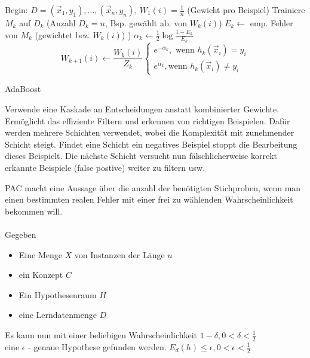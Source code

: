 \begin{algorithm}[H]
    \begin{algorithmic}
        \State Begin: $D = {(\vec{x}_1,y_1),\dots,(\vec{x}_n,y_n)}$, $W_1(i) = \frac{1}{n}$ (Gewicht pro Beispiel)
        \State Trainiere $M_k$ auf $D_k$ (Anzahl $D_k = n$, Bsp. gewählt ab. von $W_k(i)$)
        \State $E_k \leftarrow$ emp. Fehler von $M_k$ (gewichtet bez. $W_k(i)$) )
        \State $\alpha_k \leftarrow \frac{1}{2} \log \frac{1-E_k}{E_k}$
        \begin{equation}W_{k+1}(i) \leftarrow \frac{W_k(i)}{Z_k}\begin{cases}
            e^{-\alpha_k}, \text{ wenn } h_k(\vec{x}_i) = y_i \\
                                                            e^{\alpha_k}, \text{wenn } h_k(\vec{x}_i) \neq y_i
                                                        \end{cases}\end{equation}
        \EndFor
        \caption{AdaBoost}
    \end{algorithmic}
\end{algorithm}

Verwende eine Kaskade an Entscheidungen anstatt kombinierter Gewichte.
Ermöglicht das effiziente Filtern und erkennen von richtigen Beispielen.
Dafür werden mehrere Schichten verwendet, wobei die Komplexität mit zunehmender
Schicht steigt. Findet eine Schicht ein negatives Beispiel stoppt die Bearbeitung
dieses Beispielt. Die nächste Schicht versucht nun fälschlicherweise korrekt
erkannte Beispiele (false postive) weiter zu filtern usw.


PAC macht eine Aussage über die anzahl der benötigten Stichproben, wenn
man einen bestimmten realen Fehler mit einer frei zu wählenden Wahrscheinlichkeit
bekommen will.\\\\

Gegeben
\begin{itemize}
    \item Eine Menge $X$ von Instanzen der Länge $n$
    \item ein Konzept $C$
    \item Ein Hypothesenraum $H$
    \item eine Lerndatenmenge $D$
\end{itemize}
Es kann nun mit einer beliebigen Wahrscheinlichkeit $1-\delta, 0<\delta<\frac{1}{2}$ \\
eine $\epsilon$ - genaue Hypothese gefunden werden. $E_d(h) \leq \epsilon, 0<\epsilon<\frac{1}{2}$

